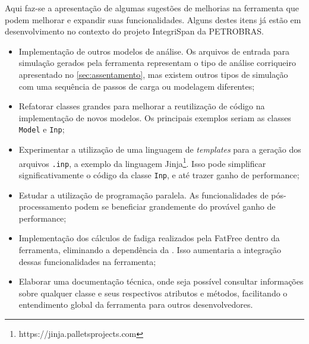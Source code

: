 Aqui faz-se a apresentação de algumas sugestões de melhorias na ferramenta que podem melhorar e expandir suas funcionalidades. Alguns destes itens já estão em desenvolvimento no contexto do projeto IntegriSpan da PETROBRAS.

\begin{itemize}
    \item Implementação de outros modelos de análise. Os arquivos de entrada para simulação gerados pela ferramenta representam o tipo de análise corriqueiro apresentado no \autoref{sec:assentamento}, mas existem outros tipos de simulação com uma sequência de passos de carga ou modelagem diferentes;
    \item Refatorar classes grandes para melhorar a reutilização de código na implementação de novos modelos. Os principais exemplos seriam as classes \texttt{Model} e \texttt{Inp};
    \item Experimentar a utilização de uma linguagem de \textit{templates} para a geração dos arquivos \texttt{.inp}, a exemplo da linguagem Jinja\footnote{https://jinja.palletsprojects.com}. Isso pode simplificar significativamente o código da classe \texttt{Inp}, e até trazer ganho de performance;
    \item Estudar a utilização de programação paralela. As funcionalidades de pós-processamento podem se beneficiar grandemente do provável ganho de performance;
    \item Implementação dos cálculos de fadiga realizados pela FatFree dentro da ferramenta, eliminando a dependência da \fatfree. Isso aumentaria a integração dessas funcionalidades na ferramenta;
    \item Elaborar uma documentação técnica, onde seja possível consultar informações sobre qualquer classe e seus respectivos atributos e métodos, facilitando o entendimento global da ferramenta para outros desenvolvedores.
\end{itemize}